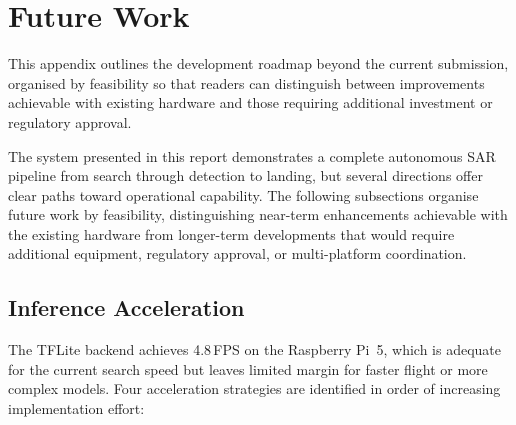 \section{Future Work}\label{sec:future}

This appendix outlines the development roadmap beyond the current submission, organised by feasibility so that readers can distinguish between improvements achievable with existing hardware and those requiring additional investment or regulatory approval.

The system presented in this report demonstrates a complete autonomous SAR pipeline from search through detection to landing, but several directions offer clear paths toward operational capability. The following subsections organise future work by feasibility, distinguishing near-term enhancements achievable with the existing hardware from longer-term developments that would require additional equipment, regulatory approval, or multi-platform coordination.

\subsection{Inference Acceleration}\label{sec:future-inference}

The TFLite backend achieves 4.8\,FPS on the Raspberry Pi~5, which is adequate for the current search speed but leaves limited margin for faster flight or more complex models. Four acceleration strategies are identified in order of increasing implementation effort:

